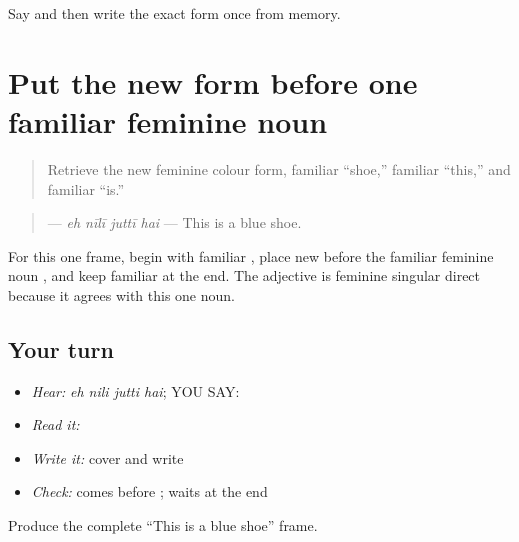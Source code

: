 \begin{tcolorbox}[breakable,colback=teal!4,colframe=teal!35!black,title={Before you move on}]
Say and then write the exact form once from memory.
\end{tcolorbox}
\section[\texorpdfstring{\pa{ਇਹ} \pa{ਨੀਲੀ} \pa{ਜੁੱਤੀ} \pa{ਹੈ} (eh nili jutti hai)}{ਇਹ ਨੀਲੀ ਜੁੱਤੀ ਹੈ (eh nili jutti hai)}]{Put the new form before one familiar feminine noun}

\label{lesson:PA-C209-blue-shoe}



\begin{quote}
Retrieve the new feminine colour form, familiar “shoe,” familiar “this,” and familiar “is.”
\end{quote}

\begin{grammarlens}[title={Grammar Lens}]
\begin{quote}
\textbf{   } — \emph{eh nīlī juttī hai} — This is a blue shoe.
\end{quote}

For this one frame, begin with familiar \textbf{}, place new \textbf{} before the familiar feminine noun \textbf{}, and keep familiar \textbf{} at the end. The adjective is feminine singular direct because it agrees with this one noun.
\end{grammarlens}

\subsection*{Your turn}
\begin{itemize}
\raggedright
  \item \emph{Hear:} \emph{eh nili jutti hai}; YOU SAY: \textbf{   }
  \item \emph{Read it:} \textbf{   }
  \item \emph{Write it:} cover and write \textbf{   }
  \item \emph{Check:} \textbf{} comes before \textbf{}; \textbf{} waits at the end
\end{itemize}

\begin{tcolorbox}[breakable,colback=teal!4,colframe=teal!35!black,title={Before you move on}]
Produce the complete “This is a blue shoe” frame.
\end{tcolorbox}
